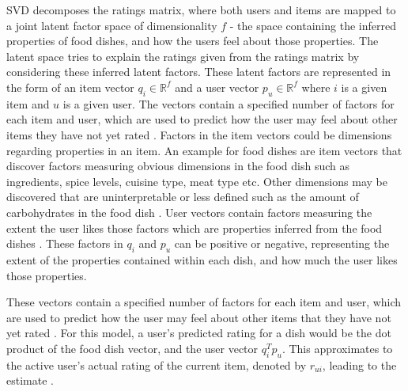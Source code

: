 SVD decomposes the ratings matrix, where both users and items are mapped to a joint latent factor space of dimensionality \begin{math} f \end{math} - the space containing the inferred properties of food dishes, and how the users feel about those properties. The latent space tries to explain the ratings given from the ratings matrix by considering these inferred latent factors. These latent factors are represented in the form of an item vector \begin{math} q_{i} \in \mathbb{R}^f  \end{math} and a user vector \begin{math} p_{u} \in \mathbb{R}^f  \end{math} where \begin{math} i \end{math} is a given item and \begin{math} u \end{math} is a given user. The vectors contain a specified number of factors for each item and user, which are used to predict how the user may feel about other items they have not yet rated \cite{koren2009matrix}. Factors in the item vectors could be dimensions regarding properties in an item. An example for food dishes are item vectors that discover factors measuring obvious dimensions in the food dish such as ingredients, spice levels, cuisine type, meat type etc. Other dimensions may be discovered that are uninterpretable or less defined such as the amount of carbohydrates in the food dish \cite{koren2009matrix}. User vectors contain factors measuring the extent the user likes those factors which are properties inferred from the food dishes \cite{koren2009matrix}. These factors in \begin{math} q_{i} \end{math} and \begin{math} p_{u} \end{math} can be positive or negative, representing the extent of the properties contained within each dish, and how much the user likes those properties. 

These vectors contain a specified number of factors for each item and user, which are used to predict how the user may feel about other items that they have not yet rated \cite{koren2009matrix}. For this model, a user's predicted rating for a dish would be the dot product of the food dish vector, and the user vector \begin{math} q_{i}^T p_{u} \end{math}. This approximates to the active user's actual rating of the current item, denoted by \begin{math} r_{ui} \end{math}, leading to the estimate \cite{koren2009matrix}.

